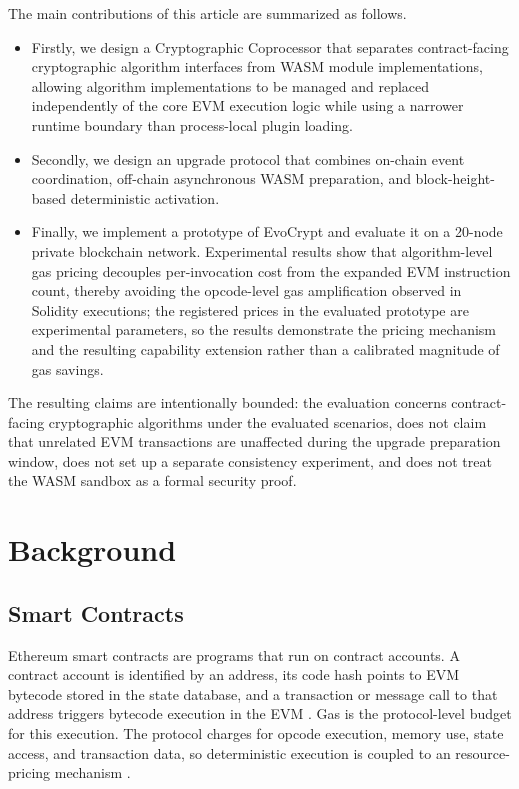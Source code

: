 \documentclass[pdflatex,sn-mathphys-num]{sn-jnl}%
\theoremstyle{thmstyleone}%
\theoremstyle{thmstyletwo}%
\theoremstyle{thmstylethree}%
\begin{document}
The main contributions of this article are summarized as follows.
\begin{itemize}
    \item Firstly, we design a Cryptographic Coprocessor that separates contract-facing cryptographic algorithm interfaces from WASM module implementations, allowing algorithm implementations to be managed and replaced independently of the core EVM execution logic while using a narrower runtime boundary than process-local plugin loading.
    \item Secondly, we design an upgrade protocol that combines on-chain event coordination, off-chain asynchronous WASM preparation, and block-height-based deterministic activation.
    \item Finally, we implement a prototype of EvoCrypt and evaluate it on a 20-node private blockchain network. Experimental results show that algorithm-level gas pricing decouples per-invocation cost from the expanded EVM instruction count, thereby avoiding the opcode-level gas amplification observed in Solidity executions; the registered prices in the evaluated prototype are experimental parameters, so the results demonstrate the pricing mechanism and the resulting capability extension rather than a calibrated magnitude of gas savings.
\end{itemize}
The resulting claims are intentionally bounded: the evaluation concerns contract-facing cryptographic algorithms under the evaluated scenarios, does not claim that unrelated EVM transactions are unaffected during the upgrade preparation window, does not set up a separate consistency experiment, and does not treat the WASM sandbox as a formal security proof.

\section{Background}\label{sec2}

\subsection{Smart Contracts}\label{sec2.1}
Ethereum smart contracts are programs that run on contract accounts. A contract account is identified by an address, its code hash points to EVM bytecode stored in the state database, and a transaction or message call to that address triggers bytecode execution in the EVM \cite{ethereumSmartContracts,ethereumAccounts,woodEthereumYellowPaper}. Gas is the protocol-level budget for this execution. The protocol charges for opcode execution, memory use, state access, and transaction data, so deterministic execution is coupled to an resource-pricing mechanism \cite{woodEthereumYellowPaper,buterin2016eip150}.
\end{document}

